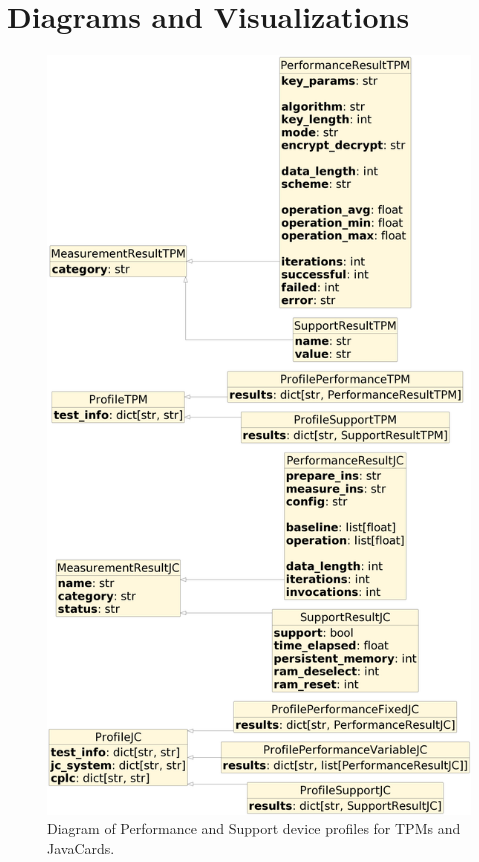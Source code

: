\chapter{Diagrams and Visualizations}\label{appendix:diagrams-visualizations}
\begin{figure}[H]
    \centering
    \includegraphics[width=\textwidth,height=\textheight-5cm, keepaspectratio]{img/diagrams/object_diagram.png}
    \caption{Diagram of Performance and Support device profiles for TPMs and JavaCards.}
    \label{fig:dev-profiles-diagram}
\end{figure}



